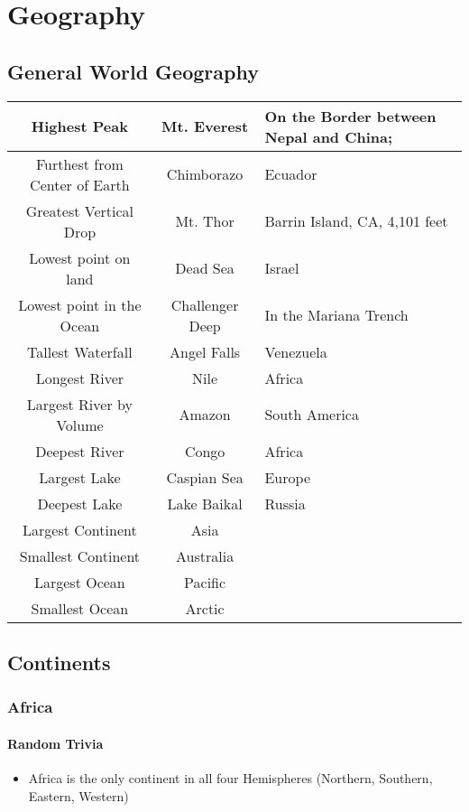 \chapter{Geography}
	\section{General World Geography}
		\begin{longtable}{|c|c|p{3in}|}
			\hline
			Highest Peak & Mt. Everest & On the Border between Nepal and China;  \\
			\hline
			Furthest from Center of Earth & Chimborazo & Ecuador \\
			\hline
			Greatest Vertical Drop & Mt. Thor & Barrin Island, CA, 4,101 feet \\
			\hline
			Lowest point on land & Dead Sea& Israel \\
			\hline
			Lowest point in the Ocean & Challenger Deep & In the Mariana Trench \\
			\hline
			Tallest Waterfall & Angel Falls & Venezuela \\
			\hline
			Longest River & Nile & Africa \\
			\hline
			Largest River by Volume & Amazon & South America \\
			\hline
			Deepest River & Congo & Africa \\
			\hline
			Largest Lake & Caspian Sea & Europe \\
			\hline
			Deepest Lake & Lake Baikal & Russia \\
			\hline
			Largest Continent & Asia & \\
			\hline
			Smallest Continent & Australia & \\ 
			\hline
			Largest Ocean & Pacific & \\
			\hline
			Smallest Ocean & Arctic & \\
			\hline
			
			
			
		\end{longtable}
	\section{Continents}
	\subsection{Africa}
		\subsubsection{Random Trivia}
		\begin{itemize} 
			\item Africa is the only continent in all four Hemispheres (Northern, Southern, Eastern, Western)
		\end{itemize}
